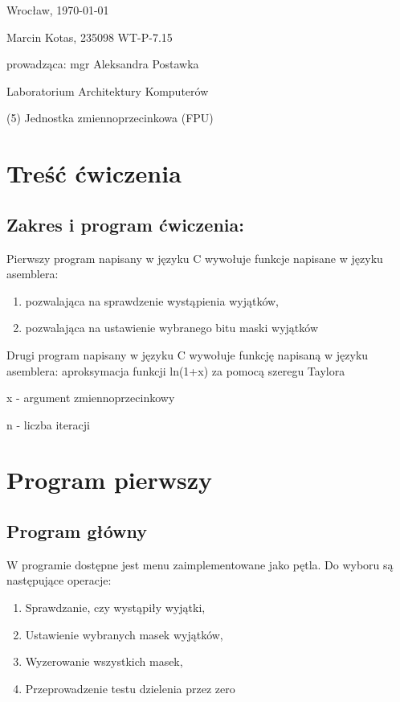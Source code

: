 \documentclass[polish, 11pt]{article}
\begin{document}
	\begin{flushright}
		Wrocław, \today
	\end{flushright}
	
	Marcin Kotas, 235098
	WT-P-7.15
	
	\begin{flushright}
		prowadząca: mgr Aleksandra Postawka
	\end{flushright}
	
	\begin{center}
		Laboratorium Architektury Komputerów
	
		(5)	Jednostka zmiennoprzecinkowa (FPU)
	\end{center}
	
	\vspace{8cm}

\section{Treść ćwiczenia}
	\subsection*{Zakres i program ćwiczenia:}
		Pierwszy program napisany w języku C wywołuje funkcje napisane w języku asemblera:
		\begin{enumerate}
			\item pozwalająca na sprawdzenie wystąpienia wyjątków,
			\item pozwalająca na ustawienie wybranego bitu maski wyjątków
		\end{enumerate}

		Drugi program napisany w języku C wywołuje funkcję napisaną w języku asemblera:\newline
		aproksymacja funkcji ln(1+x) za pomocą szeregu Taylora

		x - argument zmiennoprzecinkowy
		
		n - liczba iteracji

\newpage
\section{Program pierwszy}
	\subsection{Program główny}
			W programie dostępne jest menu zaimplementowane jako pętla.
			Do wyboru są następujące operacje:
			\begin{enumerate}
				\item Sprawdzanie, czy wystąpiły wyjątki,
				\item Ustawienie wybranych masek wyjątków,
				\item Wyzerowanie wszystkich masek,
				\item Przeprowadzenie testu dzielenia przez zero
			\end{enumerate}
\end{document}
